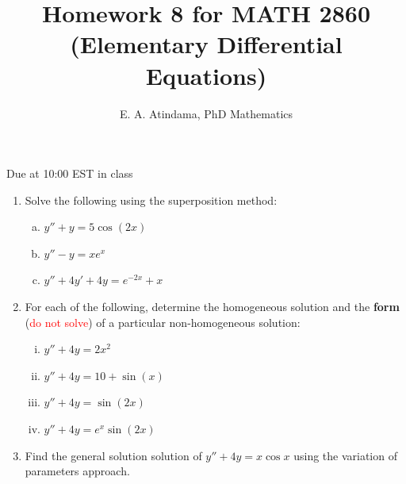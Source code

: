 \documentclass[a4paper,11pt,reqno]{amsart}
\title[MATH 2860 (Elementary Differential Equations)]{Homework 8 for MATH 2860 (Elementary Differential Equations)}
\author[Emmanuel Atindama]{E. A. Atindama, PhD Mathematics}
\numberwithin{equation}{section}
\begin{document}
\maketitle

Due at 10:00 EST in class

\begin{enumerate}
  \item[\textbf{Q1}] Solve the following using the superposition method:
    \begin{enumerate}[(a)]
      \item $y''+y=5\cos(2x)$
      \item $y''-y=xe^x$
      \item $y''+4y'+4y=e^{-2x}+x$
    \end{enumerate}

  \vspace{0.5cm}

  \item[\textbf{Q2}] For each of the following, determine the homogeneous solution and the \textbf{form} (\textcolor{red}{do not solve}) of a 
    particular non-homogeneous solution:
      \begin{enumerate}[(i)]
        \item \(y'' + 4y = 2x^{2}\)
        \item \(y'' + 4y = 10 + \sin(x)\)
        \item \(y'' + 4y = \sin(2 x)\)
        \item \(y'' + 4y = e^{x}\sin(2 x)\)
      \end{enumerate}

  \item[\textbf{Q3}] Find the general solution solution of \(y'' + 4y = x\cos{x}\) using the variation of parameters approach.
\end{enumerate}
    
\end{document}
